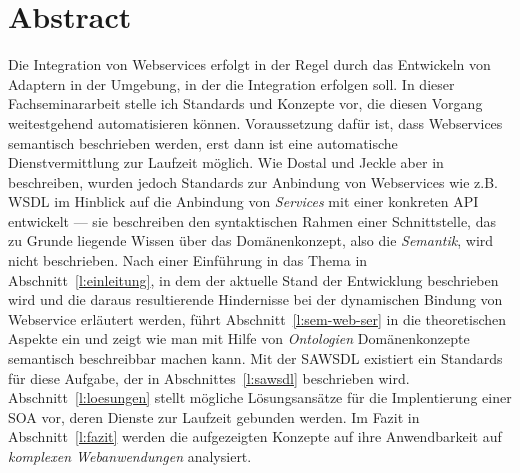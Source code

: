 \section*{Abstract}

Die Integration von Webservices erfolgt in der Regel durch das Entwickeln von Adaptern in der Umgebung, in der die Integration erfolgen soll. In dieser Fachseminararbeit stelle ich Standards und Konzepte vor, die diesen Vorgang weitestgehend automatisieren können. Voraussetzung dafür ist, dass Webservices semantisch beschrieben werden, erst dann ist eine automatische Dienstvermittlung zur Laufzeit möglich. Wie Dostal und Jeckle aber in \cite[S.55]{xmlspek1} beschreiben, wurden jedoch Standards zur Anbindung von Webservices wie z.B. \acs{WSDL} im Hinblick auf die Anbindung von \emph{Services} mit einer konkreten \acs{API} entwickelt --- sie beschreiben den syntaktischen Rahmen einer Schnittstelle, das zu Grunde liegende Wissen über das Domänenkonzept, also die \emph{Semantik}, wird nicht beschrieben. Nach einer Einführung in das Thema in Abschnitt~\ref{l:einleitung}, in dem der aktuelle Stand der Entwicklung beschrieben wird und die daraus resultierende Hindernisse bei der dynamischen Bindung von Webservice erläutert werden, führt Abschnitt~\ref{l:sem-web-ser} in die theoretischen Aspekte ein und zeigt wie man mit Hilfe von \emph{Ontologien} Domänenkonzepte semantisch beschreibbar machen kann. Mit der \acs{SAWSDL} existiert ein Standards für diese Aufgabe, der in Abschnittes~\ref{l:sawsdl} beschrieben wird. Abschnitt~\ref{l:loesungen} stellt mögliche Lösungsansätze für die Implentierung einer \acs{SOA} vor, deren Dienste zur Laufzeit gebunden werden. Im Fazit in Abschnitt~\ref{l:fazit} werden die aufgezeigten Konzepte auf ihre Anwendbarkeit auf \emph{komplexen Webanwendungen} analysiert.